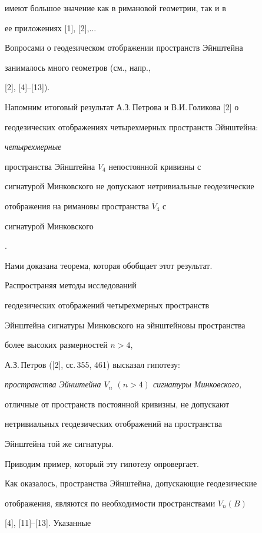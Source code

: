 имеют большое значение как в римановой геометрии, так и в


ее приложениях [1], [2],$\dotsc$


Вопросами о геодезическом отображении пространств Эйнштейна 


занималось много геометров (см., напр., 


[2], [4]--[13]).





Напомним итоговый результат А.З.\,Петрова и В.И.\,Голикова [2] о


геодезических отображениях четырехмерных пространств Эйнштейна:


{\it четырехмерные


пространства Эйнштейна $V_4$ непостоянной кривизны с


сигнатурой Минковского  не допускают нетривиальные геодезические


отображения на римановы пространства $\overline V_4$ с


сигнатурой Минковского}. 


Нами доказана теорема, которая обобщает этот результат.





Распространяя методы исследований


геодезических отображений четырехмерных пространств


Эйнштейна сигнатуры Минковского на эйнштейновы пространства


более высоких размерностей $n>4$,


А.З.\,Петров ([2], сс.\,355, 461)  высказал гипотезу:


{\it пространства Эйнштейна $V_n$ $(n>4)$ сигнатуры Минковского,


отличные от пространств постоянной кривизны, не допускают


нетривиальных геодезических отображений на пространства


Эйнштейна той же сигнатуры.}


Приводим пример, который эту гипотезу опровергает.








Как оказалось, пространства Эйнштейна, допускающие геодезические


отображения, являются по необходимости пространствами $V_n(B)$


[4], [11]--[13].  Указанные


